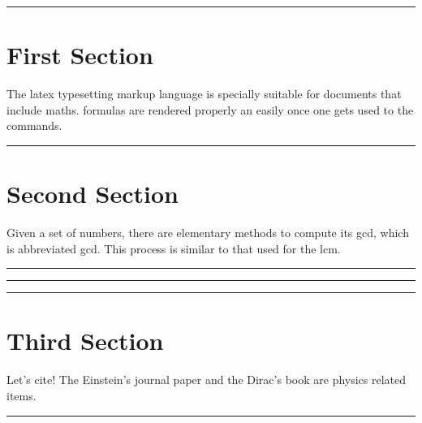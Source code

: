 \documentclass{article}
\newcommand{\addDividingLine}{\vspace{1cm}\hrule\vspace{1cm}}
\begin{document}
\tableofcontents

\addDividingLine

\section{First Section}

The \Gls{latex} typesetting markup language is specially suitable for documents that include \gls{maths}. \Glspl{formula} are rendered properly an easily once one gets used to the commands.

\addDividingLine

\section{Second Section}

\vspace{5mm}

Given a set of numbers, there are elementary methods to compute its \acrlong{gcd}, which is abbreviated \acrshort{gcd}. This process is similar to that used for the \acrfull{lcm}.

\addDividingLine

\printglossary

\addDividingLine

\printglossary[type=\acronymtype]

\addDividingLine

\section{Third Section}

\vspace{5mm}

Let's cite! The Einstein's journal paper \cite{einstein} and the Dirac's book \cite{dirac} are physics related items.

\addDividingLine

\printbibliography
\end{document}
